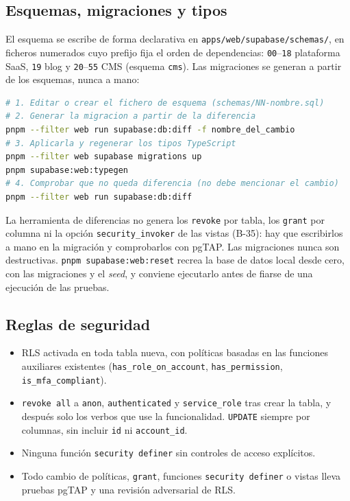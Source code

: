 \subsection{Esquemas, migraciones y tipos}

El esquema se escribe de forma declarativa en
\texttt{apps/web/supabase/schemas/}, en ficheros numerados cuyo prefijo fija el
orden de dependencias: \texttt{00}--\texttt{18} plataforma SaaS,
\texttt{19} blog y \texttt{20}--\texttt{55} CMS (esquema \texttt{cms}). Las
migraciones se generan a partir de los esquemas, nunca a mano:

\begin{lstlisting}[language=bash]
# 1. Editar o crear el fichero de esquema (schemas/NN-nombre.sql)
# 2. Generar la migracion a partir de la diferencia
pnpm --filter web run supabase:db:diff -f nombre_del_cambio
# 3. Aplicarla y regenerar los tipos TypeScript
pnpm --filter web supabase migrations up
pnpm supabase:web:typegen
# 4. Comprobar que no queda diferencia (no debe mencionar el cambio)
pnpm --filter web run supabase:db:diff
\end{lstlisting}

La herramienta de diferencias no genera los \texttt{revoke} por tabla, los
\texttt{grant} por columna ni la opción \texttt{security\_invoker} de las
vistas (B-35): hay que escribirlos a mano en la migración y comprobarlos con
pgTAP. Las migraciones nunca son destructivas. \texttt{pnpm
supabase:web:reset} recrea la base de datos local desde cero, con las
migraciones y el \textit{seed}, y conviene ejecutarlo antes de fiarse de una
ejecución de las pruebas.

\subsection{Reglas de seguridad}

\begin{itemize}
  \item RLS activada en toda tabla nueva, con políticas basadas en las
        funciones auxiliares existentes (\texttt{has\_role\_on\_account},
        \texttt{has\_permission}, \texttt{is\_mfa\_compliant}).
  \item \texttt{revoke all} a \texttt{anon}, \texttt{authenticated} y
        \texttt{service\_role} tras crear la tabla, y después solo los verbos
        que use la funcionalidad. \texttt{UPDATE} siempre por columnas, sin
        incluir \texttt{id} ni \texttt{account\_id}.
  \item Ninguna función \texttt{security definer} sin controles de acceso
        explícitos.
  \item Todo cambio de políticas, \texttt{grant}, funciones
        \texttt{security definer} o vistas lleva pruebas pgTAP y una revisión
        adversarial de RLS.
\end{itemize}


